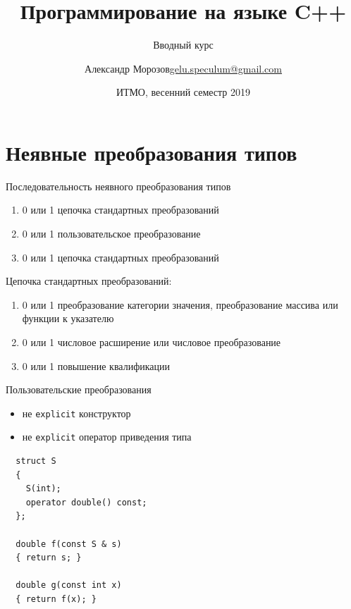 \documentclass[unknownkeysallowed,xcolor=table]{beamer}
\title[C++]
{Программирование на языке C++}
\subtitle{Вводный курс}
\author[А.~Б.~Морозов]
{
  \texorpdfstring{Александр Морозов\newline\href{mailto:gelu.speculum@gmail.com}{gelu.speculum@gmail.com}}
  {Александр Морозов}
}
\date[ITMO 2019]
{ИТМО, весенний семестр 2019}
\begin{document}
\frame{\titlepage}



\section{Неявные преобразования типов}

\begin{frame}{Последовательность неявного преобразования типов}
  \begin{enumerate}
    \item 0 или 1 цепочка стандартных преобразований \vspace{0.5em}
    \item 0 или 1 пользовательское преобразование \vspace{0.5em}
    \item 0 или 1 цепочка стандартных преобразований
  \end{enumerate}

  \vspace{1em}

  Цепочка стандартных преобразований: \vspace{0.5em}
  \begin{enumerate}
    \item 0 или 1 преобразование категории значения, преобразование массива или функции к указателю \vspace{0.5em}
    \item 0 или 1 числовое расширение или числовое преобразование \vspace{0.5em}
    \item 0 или 1 повышение квалификации
  \end{enumerate}
\end{frame}

\begin{frame}[fragile]{Пользовательские преобразования}
  \begin{itemize}
    \item не \lstinline{explicit} конструктор \vspace{0.5em}
    \item не \lstinline{explicit} оператор приведения типа
  \end{itemize}
  \begin{lstlisting}
  struct S
  {
    S(int);
    operator double() const;
  };

  double f(const S & s)
  { return s; }

  double g(const int x)
  { return f(x); }
  \end{lstlisting}
\end{frame}
\end{document}
